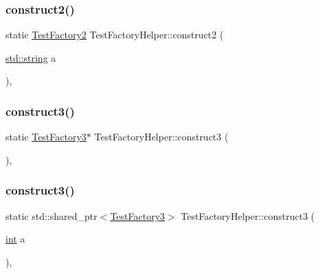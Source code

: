\mbox{\label{class_test_factory_helper_a4e3f8371835ae3517ca6ad7a7aff78b5}} 
\subsubsection{\texorpdfstring{construct2()}{construct2()}\hspace{0.1cm}{\footnotesize\ttfamily [3/3]}}
{\footnotesize\ttfamily static \mbox{\hyperlink{class_test_factory2}{Test\+Factory2}} Test\+Factory\+Helper\+::construct2 (\begin{DoxyParamCaption}\item[{\mbox{\hyperlink{_s_d_l__opengl__glext_8h_ab4ccfaa8ab0e1afaae94dc96ef52dde1}{std\+::string}}}]{a }\end{DoxyParamCaption})\hspace{0.3cm}{\ttfamily [inline]}, {\ttfamily [static]}}

\mbox{\label{class_test_factory_helper_aa771c4cc605c1c3bb51c97913b15b3e6}} 
\subsubsection{\texorpdfstring{construct3()}{construct3()}\hspace{0.1cm}{\footnotesize\ttfamily [1/2]}}
{\footnotesize\ttfamily static \mbox{\hyperlink{class_test_factory3}{Test\+Factory3}}$\ast$ Test\+Factory\+Helper\+::construct3 (\begin{DoxyParamCaption}{ }\end{DoxyParamCaption})\hspace{0.3cm}{\ttfamily [inline]}, {\ttfamily [static]}}

\mbox{\label{class_test_factory_helper_aa5fd20141fdc7ddaed749200a0057b4f}} 
\subsubsection{\texorpdfstring{construct3()}{construct3()}\hspace{0.1cm}{\footnotesize\ttfamily [2/2]}}
{\footnotesize\ttfamily static std\+::shared\+\_\+ptr$<$\mbox{\hyperlink{class_test_factory3}{Test\+Factory3}}$>$ Test\+Factory\+Helper\+::construct3 (\begin{DoxyParamCaption}\item[{\mbox{\hyperlink{warnings_8h_a74f207b5aa4ba51c3a2ad59b219a423b}{int}}}]{a }\end{DoxyParamCaption})\hspace{0.3cm}{\ttfamily [inline]}, {\ttfamily [static]}}



